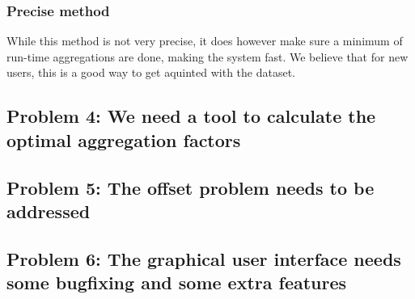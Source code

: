\subsubsection{Precise method}


While this method is not very precise, it does however make sure a minimum of run-time aggregations are done, making the system fast. We believe that for new users, this is a good way to get aquinted with the dataset.
\subsection{Problem 4: We need a tool to calculate the optimal aggregation factors}
\subsection{Problem 5: The offset problem needs to be addressed}
\subsection{Problem 6: The graphical user interface needs some bugfixing and some extra features}
